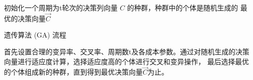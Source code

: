 \documentclass[withoutpreface,bwprint]{cumcmthesis} %
\begin{document}
\begin{adjustbox}{width=16cm,height=6.5cm}
	\centering
	\begin{algorithm}[H]
		\SetAlgoLined
		初始化一个周期为t轮次的决策列向量 $C$ 的种群，种群中的个体是随机生成的\;
		\Return 最优的决策向量$\vec{C}$
		\caption{遗传算法 (GA) 流程}
	\end{algorithm}
\end{adjustbox}
首先设置合理的变异率、交叉率、周期数t及各成本参数。通过对随机生成的决策向量进行适应度计算，选择适应度高的个体进行交叉和变异操作，
最后选择最优的个体组成新的种群，直到得到最优决策向量$\vec{C}$为止。
\end{document}
